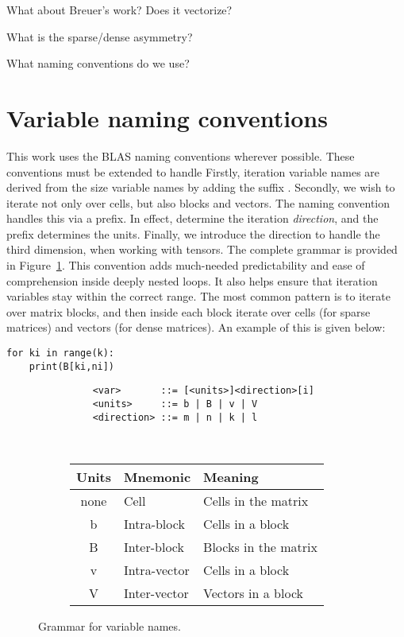 What about Breuer's work? Does it vectorize?

What is the sparse/dense asymmetry?

What naming conventions do we use?



\section{Variable naming conventions}


This work uses the BLAS naming conventions wherever possible. These conventions must be extended to handle 
Firstly, iteration variable names are derived from the size variable names by adding the suffix . Secondly, we wish to iterate not only over cells, but also blocks and vectors. The naming convention handles this via a prefix. In effect,  determine the iteration \emph{direction}, and the prefix determines the units. Finally, we introduce the direction  to handle the third dimension, when working with tensors. The complete grammar is provided in Figure~\ref{fig:grammar}. This convention adds much-needed predictability and ease of comprehension inside deeply nested loops. It also helps ensure that iteration variables stay within the correct range. The most common pattern is to iterate over matrix blocks, and then inside each block iterate over cells (for sparse matrices) and vectors (for dense matrices). An example of this is given below:

\begin{verbatim}
for ki in range(k):
	print(B[ki,ni])
\end{verbatim}

\begin{figure}[tbh]
  \centering
  \begin{subfigure}[l]{0.48\textwidth}
      \begin{verbatim}
    <var>       ::= [<units>]<direction>[i]
    <units>     ::= b | B | v | V
    <direction> ::= m | n | k | l
  \end{verbatim}
  \end{subfigure}
  ~~~~
  \begin{subfigure}[r]{0.45\textwidth}
    \centering
    \begin{tabular}{cll}
		\toprule
		Units    & Mnemonic & Meaning \\
		\midrule

		none  & Cell          & Cells in the matrix      \\
		b     & Intra-block   & Cells in a block         \\
		B     & Inter-block   & Blocks in the matrix     \\
		v     & Intra-vector  & Cells in a block         \\
		V     & Inter-vector  & Vectors in a block       \\
		\bottomrule
	\end{tabular}
  \end{subfigure}
  \caption{Grammar for variable names.}
  \label{fig:grammar}
\end{figure}


